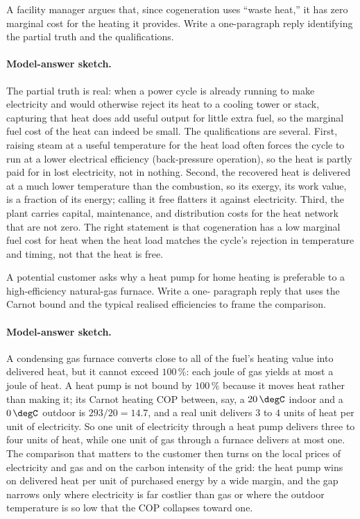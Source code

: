 \begin{exercise}
A facility manager argues that, since cogeneration uses ``waste
heat,'' it has zero marginal cost for the heating it provides. Write
a one-paragraph reply identifying the partial truth and the
qualifications.

\paragraph{Model-answer sketch.} The partial truth is real: when a power
cycle is already running to make electricity and would otherwise reject
its heat to a cooling tower or stack, capturing that heat does add
useful output for little extra fuel, so the marginal fuel cost of the
heat can indeed be small. The qualifications are several. First, raising
steam at a useful temperature for the heat load often forces the cycle
to run at a lower electrical efficiency (back-pressure operation), so
the heat is partly paid for in lost electricity, not in nothing.
Second, the recovered heat is delivered at a much lower temperature than
the combustion, so its exergy, its work value, is a fraction of its
energy; calling it free flatters it against electricity. Third, the
plant carries capital, maintenance, and distribution costs for the heat
network that are not zero. The right statement is that cogeneration has
a low marginal fuel cost for heat when the heat load matches the cycle's
rejection in temperature and timing, not that the heat is free.
\end{exercise}

\begin{exercise}
A potential customer asks why a heat pump for home heating is
preferable to a high-efficiency natural-gas furnace. Write a one-
paragraph reply that uses the Carnot bound and the typical realised
efficiencies to frame the comparison.

\paragraph{Model-answer sketch.} A condensing gas furnace converts close
to all of the fuel's heating value into delivered heat, but it cannot
exceed $100\,\%$: each joule of gas yields at most a joule of heat. A
heat pump is not bound by $100\,\%$ because it moves heat rather than
making it; its Carnot heating COP between, say, a $20\,\degC$ indoor and
a $0\,\degC$ outdoor is $293/20 = 14.7$, and a real unit delivers $3$ to
$4$ units of heat per unit of electricity. So one unit of electricity
through a heat pump delivers three to four units of heat, while one unit
of gas through a furnace delivers at most one. The comparison that
matters to the customer then turns on the local prices of electricity
and gas and on the carbon intensity of the grid: the heat pump wins on
delivered heat per unit of purchased energy by a wide margin, and the
gap narrows only where electricity is far costlier than gas or where the
outdoor temperature is so low that the COP collapses toward one.
\end{exercise}
